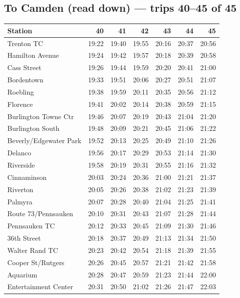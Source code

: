 \subsection*{To Camden (read down) --- trips 40--45 of 45}
\begin{center}\footnotesize\setlength{\tabcolsep}{3pt}\begin{tabular}{@{}lrrrrrr@{}}\toprule
Station & 40 & 41 & 42 & 43 & 44 & 45 \\\midrule
Trenton TC & 19:22 & 19:40 & 19:55 & 20:16 & 20:37 & 20:56 \\
Hamilton Avenue & 19:24 & 19:42 & 19:57 & 20:18 & 20:39 & 20:58 \\
Cass Street & 19:26 & 19:44 & 19:59 & 20:20 & 20:41 & 21:00 \\
Bordentown & 19:33 & 19:51 & 20:06 & 20:27 & 20:51 & 21:07 \\
Roebling & 19:38 & 19:59 & 20:11 & 20:35 & 20:56 & 21:12 \\
Florence & 19:41 & 20:02 & 20:14 & 20:38 & 20:59 & 21:15 \\
Burlington Towne Ctr & 19:46 & 20:07 & 20:19 & 20:43 & 21:04 & 21:20 \\
Burlington South & 19:48 & 20:09 & 20:21 & 20:45 & 21:06 & 21:22 \\
Beverly/Edgewater Park & 19:52 & 20:13 & 20:25 & 20:49 & 21:10 & 21:26 \\
Delanco & 19:56 & 20:17 & 20:29 & 20:53 & 21:14 & 21:30 \\
Riverside & 19:58 & 20:19 & 20:31 & 20:55 & 21:16 & 21:32 \\
Cinnaminson & 20:03 & 20:24 & 20:36 & 21:00 & 21:21 & 21:37 \\
Riverton & 20:05 & 20:26 & 20:38 & 21:02 & 21:23 & 21:39 \\
Palmyra & 20:07 & 20:28 & 20:40 & 21:04 & 21:25 & 21:41 \\
Route 73/Pennsauken & 20:10 & 20:31 & 20:43 & 21:07 & 21:28 & 21:44 \\
Pennsauken TC & 20:12 & 20:33 & 20:45 & 21:09 & 21:30 & 21:46 \\
36th Street & 20:18 & 20:37 & 20:49 & 21:13 & 21:34 & 21:50 \\
Walter Rand TC & 20:23 & 20:42 & 20:54 & 21:18 & 21:39 & 21:55 \\
Cooper St/Rutgers & 20:26 & 20:45 & 20:57 & 21:21 & 21:42 & 21:58 \\
Aquarium & 20:28 & 20:47 & 20:59 & 21:23 & 21:44 & 22:00 \\
Entertainment Center & 20:31 & 20:50 & 21:02 & 21:26 & 21:47 & 22:03 \\
\bottomrule\end{tabular}\end{center}
\clearpage
